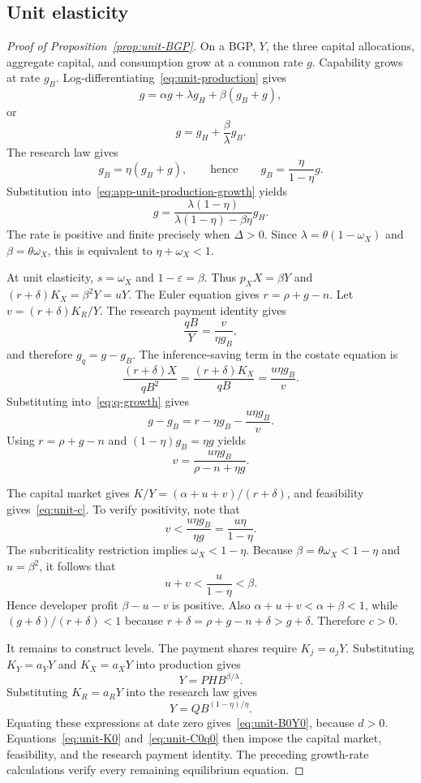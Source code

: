 \subsection{Unit elasticity}

\begin{proof}[Proof of Proposition~\ref{prop:unit-BGP}]
On a BGP, $Y$, the three capital allocations, aggregate capital, and consumption grow at a common rate $g$. Capability grows at rate $g_B$. Log-differentiating~\eqref{eq:unit-production} gives
\[
 g=\alpha g+\lambda g_H+\beta(g_B+g),
\]
or
\begin{equation}
 g=g_H+\frac{\beta}{\lambda}g_B.
 \label{eq:app-unit-production-growth}
\end{equation}
The research law gives
\[
 g_B=\eta(g_B+g),
\qquad\text{hence}\qquad
 g_B=\frac{\eta}{1-\eta}g.
\]
Substitution into~\eqref{eq:app-unit-production-growth} yields
\[
 g=\frac{\lambda(1-\eta)}{
 \lambda(1-\eta)-\beta\eta}g_H.
\]
The rate is positive and finite precisely when $\Delta>0$. Since
$\lambda=\theta(1-\omega_X)$ and $\beta=\theta\omega_X$,
this is equivalent to $\eta+\omega_X<1$.

At unit elasticity, $s=\omega_X$ and
$1-\varepsilon=\beta$. Thus
$p_XX=\beta Y$ and $(r+\delta)K_X=\beta^2Y=uY$.
The Euler equation gives $r=\rho+g-n$.
Let $v=(r+\delta)K_R/Y$. The research payment identity gives
\[
 \frac{qB}{Y}=\frac{v}{\eta g_B},
\]
and therefore $g_q=g-g_B$. The inference-saving term in the costate equation is
\[
 \frac{(r+\delta)X}{qB^2}
 =\frac{(r+\delta)K_X}{qB}
 =\frac{u\eta g_B}{v}.
\]
Substituting into~\eqref{eq:q-growth} gives
\[
 g-g_B=r-\eta g_B-\frac{u\eta g_B}{v}.
\]
Using $r=\rho+g-n$ and $(1-\eta)g_B=\eta g$ yields
\[
 v=\frac{u\eta g_B}{\rho-n+\eta g}.
\]

The capital market gives
$K/Y=(\alpha+u+v)/(r+\delta)$, and feasibility gives~\eqref{eq:unit-c}. To verify positivity, note that
\[
 v
 <\frac{u\eta g_B}{\eta g}
 =\frac{u\eta}{1-\eta}.
\]
The subcriticality restriction implies
$\omega_X<1-\eta$. Because $\beta=\theta\omega_X<1-\eta$ and
$u=\beta^2$, it follows that
\[
 u+v<\frac{u}{1-\eta}<\beta.
\]
Hence developer profit $\beta-u-v$ is positive. Also
$\alpha+u+v<\alpha+\beta<1$, while
$(g+\delta)/(r+\delta)<1$ because
$r+\delta=\rho+g-n+\delta>g+\delta$.
Therefore $c>0$.

It remains to construct levels. The payment shares require
$K_j=a_jY$. Substituting $K_Y=a_YY$ and $K_X=a_XY$ into production gives
\[
 Y=PHB^{\beta/\lambda}.
\]
Substituting $K_R=a_RY$ into the research law gives
\[
 Y=QB^{(1-\eta)/\eta}.
\]
Equating these expressions at date zero gives~\eqref{eq:unit-B0Y0}, because
$d>0$. Equations~\eqref{eq:unit-K0} and~\eqref{eq:unit-C0q0} then impose the capital market, feasibility, and the research payment identity. The preceding growth-rate calculations verify every remaining equilibrium equation.


\end{proof}
